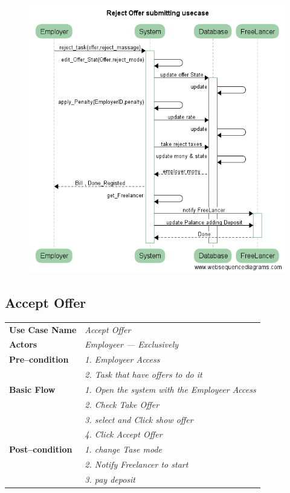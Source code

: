 \documentclass{article}
\begin{document}
\begin{figure}[ht!]
\centering
\includegraphics[width=128mm]{Reject_offer_submitting_usecase.png}
\end{figure}


\subsection{Accept Offer}
    \begin{tabular}{ l | l }
    \toprule
      \rowcolor{LightCyan}
      \textbf{Use Case Name}    & \textit{Accept Offer}\\
      \textbf{Actors}           & \textit{Employeer --- Exclusively}\\
      \rowcolor{LightCyan}
      \textbf{Pre--condition}   & \textit{1. Employeer Access}\\
                                & \textit{2. Task that have offers to do it}\\
      \textbf{Basic Flow}       & \textit{1. Open the system with the Employeer Access}\\
                                & \textit{2. Check Take Offer}\\
                                & \textit{3. select and Click show offer}\\
				& \textit{4. Click Accept Offer}\\

      \rowcolor{LightCyan}
      \textbf{Post--condition}  & \textit{1. change Tase mode}\\
                                & \textit{2. Notify Freelancer to start}\\
                                & \textit{3. pay deposit}\\
    \toprule
    \end{tabular}
\end{document}
